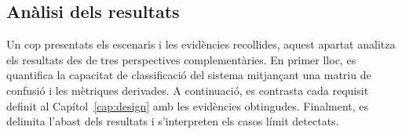 











\subsection{Anàlisi dels resultats}
\label{sec:analisi_resultats}

Un cop presentats els escenaris i les evidències recollides, aquest apartat analitza els resultats des de tres perspectives complementàries. En primer lloc, es quantifica la capacitat de classificació del sistema mitjançant una matriu de confusió i les mètriques derivades. A continuació, es contrasta cada requisit definit al Capítol~\ref{cap:design} amb les evidències obtingudes. Finalment, es delimita l’abast dels resultats i s’interpreten els casos límit detectats.






